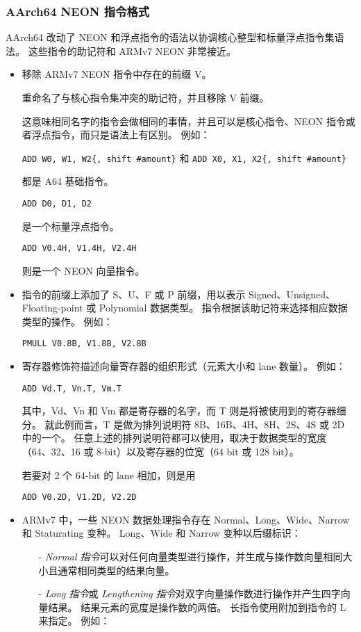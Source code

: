 \subsubsection{AArch64 NEON 指令格式}

AArch64 改动了 NEON 和浮点指令的语法以协调核心整型和标量浮点指令集语法。
这些指令的助记符和 ARMv7 NEON 非常接近。

\begin{itemize}
  \item 移除 ARMv7 NEON 指令中存在的前缀 V。

    重命名了与核心指令集冲突的助记符，并且移除 V 前缀。

    这意味相同名字的指令会做相同的事情，并且可以是核心指令、NEON 指令或者浮点指令，而只是语法上有区别。
    例如：

    \lstinline!ADD W0, W1, W2{, shift #amount}!
    和
    \lstinline!ADD X0, X1, X2{, shift #amount}!

    都是 A64 基础指令。

    \lstinline!ADD D0, D1, D2!

    是一个标量浮点指令。

    \lstinline!ADD V0.4H, V1.4H, V2.4H!

    则是一个 NEON 向量指令。

  \item 指令的前缀上添加了 S、U、F 或 P 前缀，用以表示 Signed、Unsigned、Floating-point 或 Polynomial 数据类型。
    指令根据该助记符来选择相应数据类型的操作。
    例如：

    \lstinline!PMULL V0.8B, V1.8B, V2.8B!

  \item 寄存器修饰符描述向量寄存器的组织形式（元素大小和 lane 数量）。
    例如：

    \lstinline!ADD Vd.T, Vn.T, Vm.T!

    其中，Vd、Vn 和 Vm 都是寄存器的名字，而 T 则是将被使用到的寄存器细分。
    就此例而言，T 是做为排列说明符 8B、16B、4H、8H、2S、4S 或 2D 中的一个。
    任意上述的排列说明符都可以使用，取决于数据类型的宽度（64、32、16 或 8-bit）以及寄存器的位宽（64 bit 或 128 bit）。

    若要对 2 个 64-bit 的 lane 相加，则是用

    \lstinline!ADD V0.2D, V1.2D, V2.2D!

  \item ARMv7 中，一些 NEON 数据处理指令存在 Normal、Long、Wide、Narrow 和 Staturating 变种。
    Long、Wide 和 Narrow 变种以后缀标识：

    \begin{itemize}
      \item[-] \textit{Normal 指令}可以对任何向量类型进行操作，并生成与操作数向量相同大小且通常相同类型的结果向量。
      \item[-] \textit{Long 指令}或 \textit{Lengthening 指令}对双字向量操作数进行操作并产生四字向量结果。
        结果元素的宽度是操作数的两倍。
        长指令使用附加到指令的 L 来指定。
        例如：


\end{itemize}
\end{itemize}
